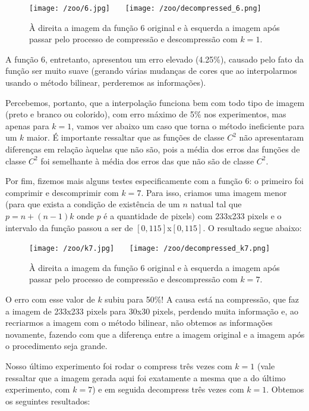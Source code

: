 \documentclass{article}
\begin{document}
		\begin{figure}[H]
			\centering
			\captionsetup{justification=centering}
			\texttt{[image: /zoo/6.jpg]} \ \ \
			\texttt{[image: /zoo/decompressed\_6.png]} \\
			\caption{À direita a imagem da função 6 original e à esquerda a imagem após passar pelo processo de compressão e descompressão com $k = 1$.}  
		\end{figure}\par
		A função 6, entretanto, apresentou um erro elevado (4.25\%), causado pelo fato da função ser muito suave (gerando várias mudanças de cores que ao interpolarmos usando o método bilinear, perderemos as informações).\par
		Percebemos, portanto, que a interpolação funciona bem com todo tipo de imagem (preto e branco ou colorido), com erro máximo de 5\% nos experimentos, mas apenas para $k = 1$, vamos ver abaixo um caso que torna o método ineficiente para um $k$ maior. É importante ressaltar que as funções de classe $C^2$ não apresentaram diferenças em relação àquelas que não são, pois a média dos erros das funções de classe $C^2$ foi semelhante à média dos erros das que não são de classe $C^2$.\par
		Por fim, fizemos mais alguns testes especificamente com a função 6: o primeiro foi comprimir e descomprimir com $k = 7$. Para isso, criamos uma imagem menor (para que exista a condição de existência de um $n$ natual tal que $p = n + (n-1)k$ onde $p$ é a quantidade de pixels) com 233x233 pixels e o intervalo da função passou a ser de $[0, 115]$x$[0, 115]$. O resultado segue abaixo:
		\begin{figure}[H]
			\centering
			\captionsetup{justification=centering}
			\texttt{[image: /zoo/k7.jpg]} \ \ \
			\texttt{[image: /zoo/decompressed\_k7.png]} \\
			\caption{À direita a imagem da função 6 original e à esquerda a imagem após passar pelo processo de compressão e descompressão com $k = 7$.}  
		\end{figure}\par
		O erro com esse valor de $k$ subiu para 50\%! A causa está na compressão, que faz a imagem de 233x233 pixels para 30x30 pixels, perdendo muita informação e, ao recriarmos a imagem com o método bilinear, não obtemos as informações novamente, fazendo com que a diferença entre a imagem original e a imagem após o procedimento seja grande.\par
		Nosso último experimento foi rodar o compress três vezes com $k = 1$ (vale ressaltar que a imagem gerada aqui foi exatamente a mesma que a do último experimento, com $k = 7$) e em seguida decompress três vezes com $k = 1$. Obtemos os seguintes resultados: 
\end{document}
